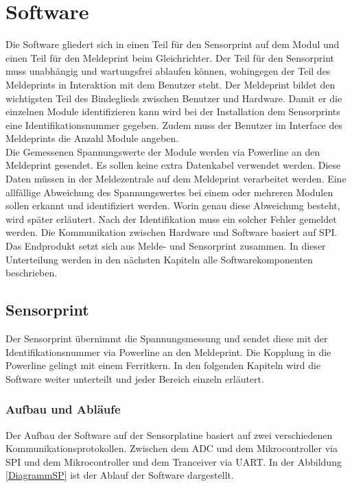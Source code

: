 
\section{Software}
Die Software gliedert sich in einen Teil für den Sensorprint auf dem Modul und einen Teil für den Meldeprint beim Gleichrichter. Der Teil für den Sensorprint muss unabhängig und wartungsfrei ablaufen können, wohingegen der Teil des Meldeprints in Interaktion mit dem Benutzer steht. Der Meldeprint bildet den wichtigsten Teil des Bindeglieds zwischen Benutzer und Hardware. Damit er die einzelnen Module identifizieren kann wird bei der Installation dem Sensorprints eine Identifikationsnummer gegeben. Zudem muss der Benutzer im Interface des Meldeprints die Anzahl Module angeben. \\

Die Gemessenen Spannungswerte der Module werden via Powerline an den Meldeprint gesendet. Es sollen keine extra Datenkabel verwendet werden. Diese Daten müssen in der Meldezentrale auf dem Meldeprint verarbeitet werden. Eine allfällige Abweichung des Spannungswertes bei einem oder mehreren Modulen sollen erkannt und identifiziert werden. Worin genau diese Abweichung besteht, wird später erläutert. Nach der Identifikation muss ein solcher Fehler gemeldet werden. Die Kommunikation zwischen Hardware und Software basiert auf SPI. Das Endprodukt setzt sich aus Melde- und Sensorprint zusammen. In dieser Unterteilung werden in den nächsten Kapiteln alle Softwarekomponenten beschrieben.
\newpage
\subsection{Sensorprint}
Der Sensorprint übernimmt die Spannungsmessung und sendet diese mit der Identifikationsnummer via Powerline an den Meldeprint. Die Kopplung in die Powerline gelingt mit einem Ferritkern. In den folgenden Kapiteln wird die Software weiter unterteilt und jeder Bereich einzeln erläutert.
\subsubsection{Aufbau und Abläufe}
Der Aufbau der Software auf der Sensorplatine basiert auf zwei verschiedenen Kommunikationsprotokollen. Zwischen dem ADC und dem Mikrocontroller via SPI und dem Mikrocontroller und dem Tranceiver via UART. In der Abbildung \ref{DiagrammSP} ist der Ablauf der Software dargestellt.

